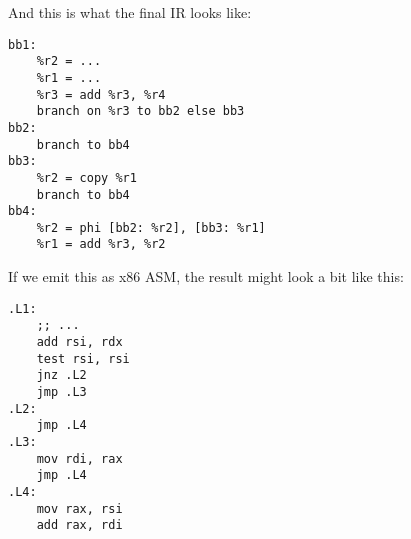 \documentclass[12pt]{report}
\begin{document}
\clearpage
\noindent And this is what the final IR looks like:
\begin{Verbatim}
bb1:
    %r2 = ...
    %r1 = ...
    %r3 = add %r3, %r4
    branch on %r3 to bb2 else bb3
bb2:
    branch to bb4
bb3:
    %r2 = copy %r1
    branch to bb4
bb4:
    %r2 = phi [bb2: %r2], [bb3: %r1]
    %r1 = add %r3, %r2
\end{Verbatim}

\noindent If we emit this as x86 ASM, the result might look a bit like this:
\begin{Verbatim}
.L1:
    ;; ...
    add rsi, rdx
    test rsi, rsi
    jnz .L2
    jmp .L3
.L2:
    jmp .L4
.L3:
    mov rdi, rax
    jmp .L4
.L4:
    mov rax, rsi
    add rax, rdi
\end{Verbatim}
\end{document}
